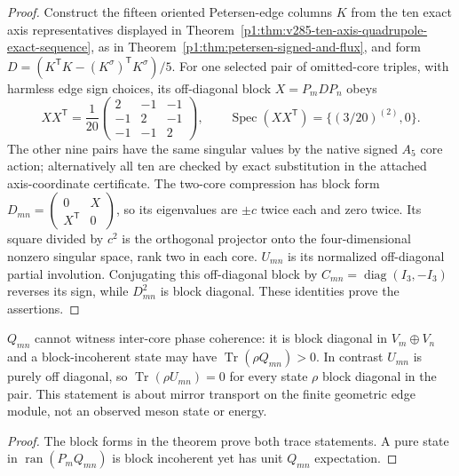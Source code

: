 \documentclass[11pt]{article}
\begin{document}
\begin{proof}
Construct the fifteen oriented Petersen-edge columns $K$ from
the ten exact axis representatives displayed in
Theorem~\ref{p1:thm:v285-ten-axis-quadrupole-exact-sequence},
as in Theorem~\ref{p1:thm:petersen-signed-and-flux}, and form
$D=(K^{\mathsf T}K-(K^\sigma)^{\mathsf T}K^\sigma)/5$.
For one selected pair of omitted-core triples, with harmless
edge sign choices, its off-diagonal block $X=P_mDP_n$ obeys
\[
 XX^{\mathsf T}=\frac1{20}
 \begin{pmatrix}2&-1&-1\\-1&2&-1\\-1&-1&2\end{pmatrix},
 \qquad \operatorname{Spec}(XX^{\mathsf T})
 =\{(3/20)^{(2)},0\}.
\]
The other nine pairs have the same singular values by the native
signed $A_5$ core action; alternatively all ten are checked by
exact substitution in the attached axis-coordinate certificate.
The two-core compression has block form
$D_{mn}=\left(\begin{smallmatrix}0&X\\X^{\mathsf T}&0\end{smallmatrix}\right)$,
so its eigenvalues are $\pm c$ twice each and zero twice.
Its square divided by $c^2$ is the orthogonal projector onto the
four-dimensional nonzero singular space, rank two in each core.
$U_{mn}$ is its normalized off-diagonal partial involution.
Conjugating this off-diagonal block by
$C_{mn}=\operatorname{diag}(I_3,-I_3)$ reverses its sign, while
$D_{mn}^2$ is block diagonal. These identities prove the assertions.
\end{proof}

\begin{corollary}
\label{p1:cor:v327-pair-eligibility-not-coherence}
$Q_{mn}$ cannot witness inter-core phase coherence: it is block
 diagonal in $V_m\oplus V_n$ and a block-incoherent state may have
$\operatorname{Tr}(\rho Q_{mn})>0$.
In contrast $U_{mn}$ is purely off diagonal, so
$\operatorname{Tr}(\rho U_{mn})=0$ for every state $\rho$ block
 diagonal in the pair. This statement is about mirror transport on the
finite geometric edge module, not an observed meson state or energy.
\end{corollary}
\begin{proof}
The block forms in the theorem prove both trace statements. A pure
state in $\operatorname{ran}(P_mQ_{mn})$ is block incoherent yet has
unit $Q_{mn}$ expectation.
\end{proof}
\end{document}
